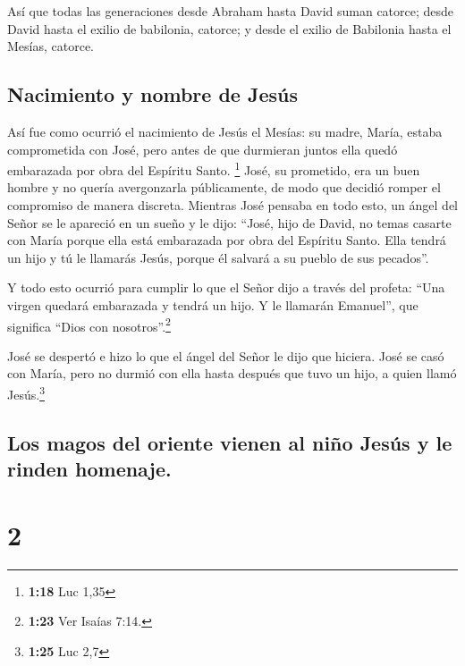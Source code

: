  Así que todas las generaciones desde Abraham hasta David
suman catorce; desde David hasta el exilio de babilonia, catorce; y
desde el exilio de Babilonia hasta el Mesías, catorce.

\hypertarget{nacimiento-y-nombre-de-jesuxfas}{%
\subsection{Nacimiento y nombre de
Jesús}\label{nacimiento-y-nombre-de-jesuxfas}}

 Así fue como ocurrió el nacimiento de Jesús el Mesías:
su madre, María, estaba comprometida con José, pero antes de que
durmieran juntos ella quedó embarazada por obra del Espíritu Santo.
\footnote{\textbf{1:18} Luc 1,35}  José, su prometido,
era un buen hombre y no quería avergonzarla públicamente, de modo que
decidió romper el compromiso de manera discreta. 
Mientras José pensaba en todo esto, un ángel del Señor se le apareció en
un sueño y le dijo: ``José, hijo de David, no temas casarte con María
porque ella está embarazada por obra del Espíritu Santo. 
Ella tendrá un hijo y tú le llamarás Jesús, porque él salvará a su
pueblo de sus pecados''.

 Y todo esto ocurrió para cumplir lo que el Señor dijo a
través del profeta:  ``Una virgen quedará embarazada y
tendrá un hijo. Y le llamarán Emanuel'', que significa ``Dios con
nosotros''.\footnote{\textbf{1:23} Ver Isaías 7:14.}

 José se despertó e hizo lo que el ángel del Señor le
dijo que hiciera.  José se casó con María, pero no durmió
con ella hasta después que tuvo un hijo, a quien llamó Jesús.\footnote{\textbf{1:25}
  Luc 2,7}

\hypertarget{los-magos-del-oriente-vienen-al-niuxf1o-jesuxfas-y-le-rinden-homenaje.}{%
\subsection{Los magos del oriente vienen al niño Jesús y le rinden
homenaje.}\label{los-magos-del-oriente-vienen-al-niuxf1o-jesuxfas-y-le-rinden-homenaje.}}

\hypertarget{section-1}{%
\section{2}\label{section-1}}

